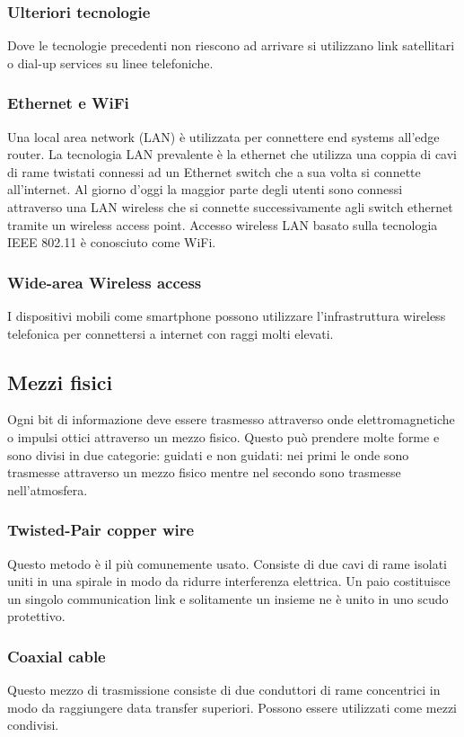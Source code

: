 \subsubsection{Ulteriori tecnologie}
Dove le tecnologie precedenti non riescono ad arrivare si utilizzano link satellitari o dial-up services su linee telefoniche. 
\subsubsection{Ethernet e WiFi}
Una local area network (LAN) \`e utilizzata per connettere end systems all'edge router. La tecnologia LAN prevalente \`e la ethernet che utilizza una coppia di cavi di rame twistati connessi ad un Ethernet switch
che a sua volta si connette all'internet. Al giorno d'oggi la maggior parte degli utenti sono connessi attraverso una LAN wireless che si connette successivamente agli switch ethernet tramite un wireless access
point. Accesso wireless LAN basato sulla tecnologia IEEE 802.11 \`e conosciuto come WiFi. 
\subsubsection{Wide-area Wireless access}
I dispositivi mobili come smartphone possono utilizzare l'infrastruttura wireless telefonica per connettersi a internet con raggi molti elevati. 
\subsection{Mezzi fisici}
Ogni bit di informazione deve essere trasmesso attraverso onde elettromagnetiche o impulsi ottici attraverso un mezzo fisico. Questo pu\`o prendere molte forme e sono divisi in due categorie: guidati e non
guidati: nei primi le onde sono trasmesse attraverso un mezzo fisico mentre nel secondo sono trasmesse nell'atmosfera. 
\subsubsection{Twisted-Pair copper wire}
Questo metodo \`e il pi\`u comunemente usato. Consiste di due cavi di rame isolati uniti in una spirale in modo da ridurre interferenza elettrica. Un paio costituisce un singolo communication link e solitamente
un insieme ne \`e unito in uno scudo protettivo. 
\subsubsection{Coaxial cable}
Questo mezzo di trasmissione consiste di due conduttori di rame concentrici in modo da raggiungere data transfer superiori. Possono essere utilizzati come mezzi condivisi. 
